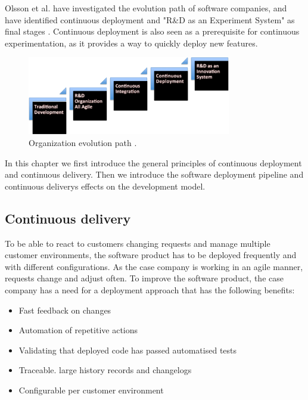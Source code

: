 \documentclass[english]{tktltiki2}
\theoremstyle{definition}
\theoremstyle{remark}
\begin{document}
Olsson et al. have investigated the evolution path of software companies, and have identified continuous deployment and "R\&D as an Experiment System" as final stages \cite{olsson2012climbing}. Continuous deployment is also seen as a prerequisite for continuous experimentation, as it provides a way to quickly deploy new features.

\begin{figure}[h]
	\centering
	\includegraphics[width=3.5in]{stairway.png}
	\caption{Organization evolution path \cite{olsson2012climbing}.}
\end{figure}

In this chapter we first introduce the general principles of continuous deployment and continuous delivery. Then we introduce the software deployment pipeline and continuous deliverys effects on the development model.




\subsection{Continuous delivery}

To be able to react to customers changing requests and manage multiple customer environments, the software product has to be deployed frequently and with different configurations. As the case company is working in an agile manner, requests change and adjust often. To improve the software product, the case company has a need for a deployment approach that has the following benefits:

\begin{itemize}
\item Fast feedback on changes
\item Automation of repetitive actions
\item Validating that deployed code has passed automatised tests 
\item Traceable. large history records and changelogs
\item Configurable per customer environment
\end{itemize}
\end{document}
